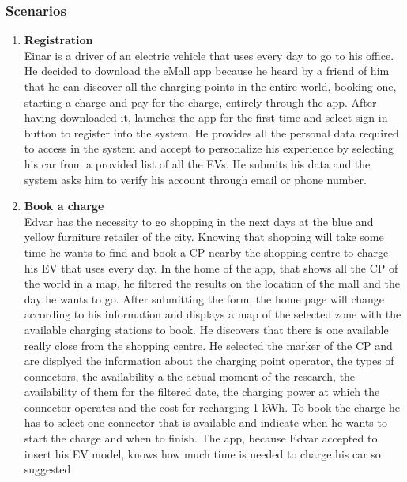 \subsubsection{Scenarios}
\begin{enumerate}[label=\textbf{\Alph*}.]
      \item \textbf{Registration} \\
            Einar is a driver of an electric vehicle that uses every day to go to his
            office. He decided to download the eMall app because he heard by a friend
            of him that he can discover all the charging points in the entire world,
            booking one, starting a charge and pay for the charge, entirely through
            the app. After having downloaded it, launches the app for the first time
            and select sign in button to register into the system. He provides all
            the personal data required to access in the system and accept to personalize
            his experience by selecting his car from a provided list of all the EVs.
            He submits his data and the system asks him to verify his account through email or phone number.
      \item \textbf{Book a charge} \\
            Edvar has the necessity to go shopping in the next days at the blue and yellow furniture retailer of the city. Knowing 
            that shopping will take some time he wants to find and book a CP nearby the shopping centre to charge his EV that uses every day.
            In the home of the app, that shows all the CP of the world in a map, he filtered the results on the location of the mall
            and the day he wants to go. After submitting the form, the home page will change according to his information and displays 
            a map of the selected zone with the available charging stations to book. He discovers that there is one available
            really close from the shopping centre. He selected the marker of the CP and are displyed the information about the charging point operator,
            the types of connectors, the availability a the actual moment of the research, the availability of them for the filtered date,
            the charging power at which the connector operates and the cost for recharging 1 kWh.
            To book the charge he has to select one connector that is available and indicate when he wants to start the charge
            and when to finish. The app, because Edvar accepted to insert his EV model, knows how much time is needed to charge his car so suggested

\end{enumerate}
